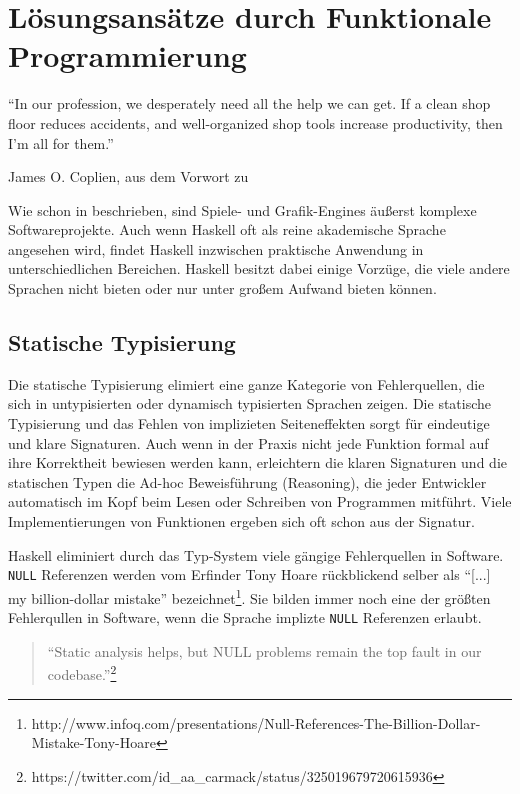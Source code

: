 \chapter{Lösungsansätze durch Funktionale Programmierung}\label{chap:loesungen-durch-fp}

\epigraph{"`In our profession, we desperately need all the help we can get. If a clean shop floor reduces accidents, and well-organized shop tools increase productivity, then I’m all for them."'}{James O. Coplien, aus dem Vorwort zu }

Wie schon in  beschrieben, sind Spiele- und Grafik-Engines äußerst komplexe Softwareprojekte. Auch wenn Haskell oft als reine akademische Sprache angesehen wird, findet Haskell inzwischen praktische Anwendung in unterschiedlichen Bereichen. Haskell besitzt dabei einige Vorzüge, die viele andere Sprachen nicht bieten oder nur unter großem Aufwand bieten können.

\section{Statische Typisierung}\label{sec:statische-typisierung}

Die statische Typisierung elimiert eine ganze Kategorie von Fehlerquellen, die sich  in untypisierten oder dynamisch typisierten Sprachen zeigen. Die statische Typisierung und das Fehlen von implizieten Seiteneffekten sorgt für eindeutige und klare Signaturen. Auch wenn in der Praxis nicht jede Funktion formal auf ihre Korrektheit bewiesen werden kann, erleichtern die klaren Signaturen und die statischen Typen die Ad-hoc Beweisführung (Reasoning), die jeder Entwickler automatisch im Kopf beim Lesen oder Schreiben von Programmen mitführt. Viele Implementierungen von Funktionen ergeben sich oft schon aus der Signatur.

Haskell eliminiert durch das Typ-System viele gängige Fehlerquellen in Software. \texttt{NULL} Referenzen werden vom Erfinder Tony Hoare rückblickend selber als "`[...] my billion-dollar mistake"' bezeichnet\footnote{http://www.infoq.com/presentations/Null-References-The-Billion-Dollar-Mistake-Tony-Hoare}. Sie bilden immer noch eine der größten Fehlerqullen in Software, wenn die Sprache implizte \texttt{NULL} Referenzen erlaubt. 

\begin{quote}
"`Static analysis helps, but NULL problems remain the top fault in our codebase."'\footnote{\label{note:carmack-null}https://twitter.com/id\_aa\_carmack/status/325019679720615936}
\end{quote}

